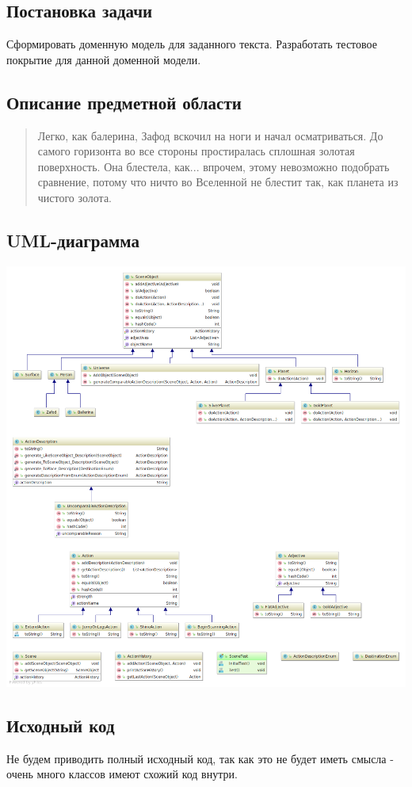 \subsection{Постановка задачи}
Сформировать доменную модель для заданного текста.  Разработать тестовое покрытие для данной доменной модели.
\subsection{Описание предметной области}
\begin{quote}
	Легко, как балерина, Зафод вскочил на ноги и начал осматриваться. До самого горизонта во все стороны простиралась сплошная золотая поверхность. Она блестела, как... впрочем, этому невозможно подобрать сравнение, потому что ничто во Вселенной не блестит так, как планета из чистого золота.
\end{quote}
\subsection{UML-диаграмма}
\includegraphics[scale=0.35]{scene_uml.png}
\subsection{Исходный код}
Не будем приводить полный исходный код, так как это не будет иметь смысла - очень много классов имеют схожий код внутри.
